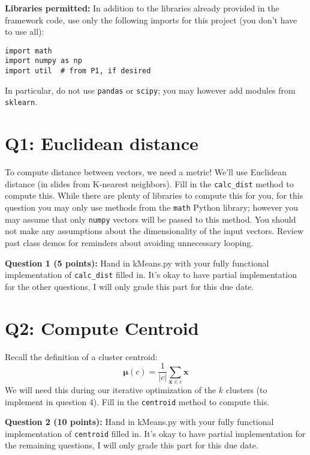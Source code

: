 \documentclass[11pt]{article}
\newcommand{\bv}{\begin{verbatim}}
\begin{document}
\vspace{0.5cm}

\noindent\textbf{Libraries permitted:}
In addition to the libraries already provided in the framework code, use only the following imports for this project (you don't have to use all):
\bv
import math
import numpy as np  
import util  # from P1, if desired
\end{verbatim}
In particular, do not use \texttt{pandas} or \texttt{scipy}; you may however add modules from \texttt{sklearn}.

\pagebreak

\section{Q1: Euclidean distance}

To compute distance between vectors, we need a metric! We'll use Euclidean distance (in slides from K-nearest neighbors). Fill in the \texttt{calc\_dist} method to compute this.
While there 
are plenty of libraries to compute this for you, for this question 
you may only use methods from the \texttt{math} Python library; however you may assume that only \texttt{numpy} vectors will be passed to this method. You should not make any assumptions about the dimensionality of the input vectors. Review past class demos for reminders about avoiding unnecessary looping. 

\textbf{Question 1 (5 points):} Hand in kMeans.py with your fully functional implementation of \texttt{calc\_dist} filled in. It's okay to have partial implementation for the other questions, I will only grade this part for this due date.



\section{Q2: Compute Centroid}

Recall the definition of a cluster centroid: 
\[ \mathbf{\mu}(c) = \frac{1}{|c|} \sum_{\mathbf{x}\in c}\mathbf{x} \]
We will need this during our iterative optimization of the $k$ clusters (to implement in question 4).  Fill in the \texttt{centroid} method to compute this.

\textbf{Question 2 (10 points):}
Hand in kMeans.py with your fully functional implementation of 
\texttt{centroid} filled in. It's okay to have partial implementation for the remaining questions, I will only grade this part for this due date.
\end{document}
